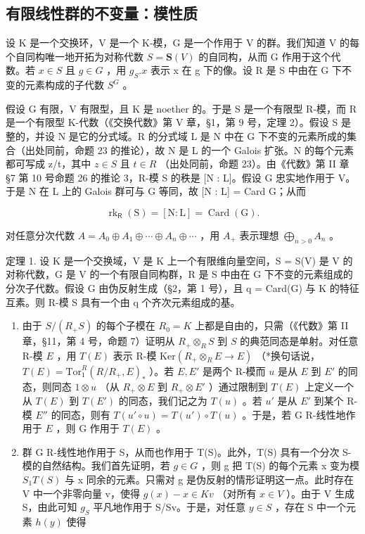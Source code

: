 \subsection{有限线性群的不变量：模性质}

设 K 是一个交换环，V 是一个 K-模，G 是一个作用于 V 的群。我们知道 V 的每个自同构唯一地开拓为对称代数 \(S = \mathbf{S}(V)\) 的自同构，从而 G 作用于这个代数。若 \(x \in S\) 且 \(g \in G\) ，用 \(g_{S}.x\) 表示 x 在 g 下的像。设 R 是 S 中由在 G 下不变的元素构成的子代数 \(S^{G}\) 。

假设 G 有限，V 有限型，且 K 是 noether 的。于是 S 是一个有限型 R-模，而 R 是一个有限型 K-代数（《交换代数》第 V 章，§1，第 9 号，定理 2）。假设 S 是整的，并设 N 是它的分式域。R 的分式域 L 是 N 中在 G 下不变的元素所成的集合（出处同前，命题 23 的推论），故 N 是 L 的一个 Galois 扩张。N 的每个元素都可写成 z/t，其中 \(z \in S\) 且 \(t \in R\) （出处同前，命题 23）。由《代数》第 II 章 §7 第 10 号命题 26 的推论 3，R-模 S 的秩是 {[}N : L{]}。假设 G 忠实地作用于 V。于是 N 在 L 上的 Galois 群可与 G 等同，故 {[}N : L{]} = Card G；从而

\[
\operatorname{rk} _ {\mathsf {R}} (\mathrm{S}) = [ \mathrm{N}: \mathrm{L} ] = \operatorname{Card} (\mathrm{G}).\tag{6}
\]

对任意分次代数 \(A = A_{0} \oplus A_{1} \oplus \cdots \oplus A_{n} \oplus \cdots\) ，用 \(A_{+}\) 表示理想 \(\bigoplus_{n > 0} A_{n}\) 。

定理 1. 设 K 是一个交换域，V 是 K 上一个有限维向量空间，S = S(V) 是 V 的对称代数，G 是 V 的一个有限自同构群，R 是 S 中由在 G 下不变的元素组成的分次子代数。假设 G 由伪反射生成（§2，第 1 号），且 q = Card(G) 与 K 的特征互素。则 R-模 S 具有一个由 q 个齐次元素组成的基。

\begin{enumerate}
\def\labelenumi{\alph{enumi})}
\item
  由于 \(S/(R_{+}S)\) 的每个子模在 \(R_0 = K\) 上都是自由的，只需（《代数》第 II 章，§11，第 4 号，命题 7）证明从 \(R_{+} \otimes_{R} S\) 到 \(S\) 的典范同态是单射。对任意 R-模 \(E\) ，用 \(T(E)\) 表示 R-模 \(\text{Ker}(R_{+} \otimes_{R} E \to E)\) （*换句话说，\(T(E) = \text{Tor}_{1}^{R}(R/R_{+}, E)_*\) ）。若 \(E, E'\) 是两个 R-模而 \(u\) 是从 \(E\) 到 \(E'\) 的同态，则同态 \(1 \otimes u\) （从 \(R_{+} \otimes E\) 到 \(R_{+} \otimes E'\) ）通过限制到 \(T(E)\) 上定义一个从 \(T(E)\) 到 \(T(E')\) 的同态，我们记之为 \(T(u)\) 。若 \(u'\) 是从 \(E'\) 到某个 R-模 \(E''\) 的同态，则有 \(T(u' \circ u) = T(u') \circ T(u)\) 。于是，若 G R-线性地作用于 \(E\) ，则 G 作用于 \(T(E)\) 。
\item
  群 G R-线性地作用于 S，从而也作用于 T(S)。此外，T(S) 具有一个分次 S-模的自然结构。我们首先证明，若 \(g \in G\) ，则 g 把 T(S) 的每个元素 x 变为模 \(S_{1}T(S)\) 与 x 同余的元素。只需对 g 是伪反射的情形证明这一点。此时存在 V 中一个非零向量 v，使得 \(g(x) - x \in Kv\) （对所有 \(x \in V\) ）。由于 V 生成 S，由此可知 \(g_{S}\) 平凡地作用于 S/Sv。于是，对任意 \(y \in S\) ，存在 S 中一个元素 \(h(y)\) 使得
\end{enumerate}

